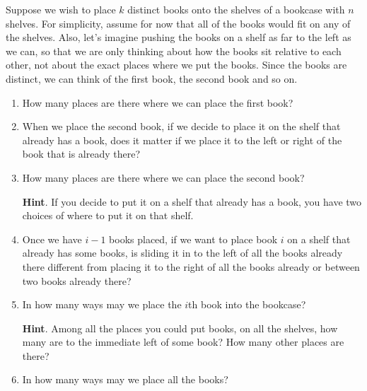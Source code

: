 \documentclass{book}
\begin{document}
\setcounter{cpjt}{124}
\addtocounter{cpjt}{-1}
\begin{activity}\label{bookcase}
\hypertarget{p-825}{}%
Suppose we wish to place \(k\) distinct books onto the shelves of a bookcase with \(n\) shelves. For simplicity, assume for now that all of the books would fit on any of the shelves. Also, let's imagine pushing the books on a shelf as far to the left as we can, so that we are only thinking about how the books sit relative to each other, not about the exact places where we put the books. Since the books are distinct, we can think of the first book, the second book and so on.%
\begin{enumerate}[font=\bfseries,label=(\alph*),ref=\alph*]
\item\label{task-161} \hypertarget{p-826}{}%
How many places are there where we can place the first book?%
\par\smallskip%
\noindent\item\label{task-162} \hypertarget{p-828}{}%
When we place the second book, if we decide to place it on the shelf that already has a book, does it matter if we place it to the left or right of the book that is already there?%
\par\smallskip%
\noindent\item\label{task-163} \hypertarget{p-830}{}%
How many places are there where we can place the second book?%
\par\smallskip%
\noindent\textbf{Hint}.\hypertarget{hint-80}{}\quad%
\hypertarget{p-831}{}%
If you decide to put it on a shelf that already has a book, you have two choices of where to put it on that shelf.%
\par\smallskip%
\noindent\item\label{task-164} \hypertarget{p-833}{}%
Once we have \(i-1\) books placed, if we want to place book \(i\)  on a shelf that already has some books, is sliding it in to the left of all the books already there different from placing it to the right of all the books already or between two books already there?%
\par\smallskip%
\noindent\item\label{task-165} \hypertarget{p-835}{}%
In how many ways may we place the \(i\)th book into the bookcase?%
\par\smallskip%
\noindent\textbf{Hint}.\hypertarget{hint-81}{}\quad%
\hypertarget{p-836}{}%
Among all the places you could put books, on all the shelves, how many are to the immediate left of some book? How many other places are there?%
\par\smallskip%
\noindent\item\label{task-166} \hypertarget{p-838}{}%
In how many ways may we place all the books?%
\par\smallskip%
\noindent\end{enumerate}
\end{activity}

\clearpage
\end{document}
